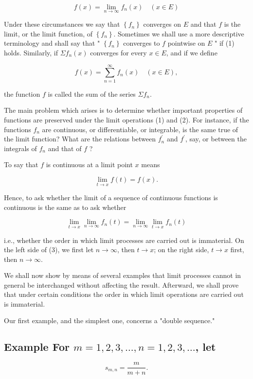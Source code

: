 \documentclass[10pt]{article}
\begin{document}
$$
f(x)=\lim _{n \rightarrow \infty} f_{n}(x) \quad(x \in E)
$$

Under these circumstances we say that $\left\{f_{n}\right\}$ converges on $E$ and that $f$ is the limit, or the limit function, of $\left\{f_{n}\right\}$. Sometimes we shall use a more descriptive terminology and shall say that " $\left\{f_{n}\right\}$ converges to $f$ pointwise on $E$ " if (1) holds. Similarly, if $\Sigma f_{n}(x)$ converges for every $x \in E$, and if we define

$$
f(x)=\sum_{n=1}^{\infty} f_{n}(x) \quad(x \in E),
$$

the function $f$ is called the sum of the series $\Sigma f_{n}$.

The main problem which arises is to determine whether important properties of functions are preserved under the limit operations (1) and (2). For instance, if the functions $f_{n}$ are continuous, or differentiable, or integrable, is the same true of the limit function? What are the relations between $f_{n}^{\prime}$ and $f^{\prime}$, say, or between the integrals of $f_{n}$ and that of $f$ ?

To say that $f$ is continuous at a limit point $x$ means

$$
\lim _{t \rightarrow x} f(t)=f(x) .
$$

Hence, to ask whether the limit of a sequence of continuous functions is continuous is the same as to ask whether

$$
\lim _{t \rightarrow x} \lim _{n \rightarrow \infty} f_{n}(t)=\lim _{n \rightarrow \infty} \lim _{t \rightarrow x} f_{n}(t)
$$

i.e., whether the order in which limit processes are carried out is immaterial. On the left side of (3), we first let $n \rightarrow \infty$, then $t \rightarrow x$; on the right side, $t \rightarrow x$ first, then $n \rightarrow \infty$.

We shall now show by means of several examples that limit processes cannot in general be interchanged without affecting the result. Afterward, we shall prove that under certain conditions the order in which limit operations are carried out is immaterial.

Our first example, and the simplest one, concerns a "double sequence."

\subsection{Example For $m=1,2,3, \ldots, n=1,2,3, \ldots$, let}
$$
s_{m, n}=\frac{m}{m+n} .
$$
\end{document}
